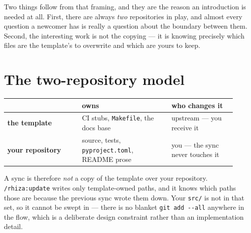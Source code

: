 \documentclass[11pt,a4paper]{article}
\newcommand{\cmd}[1]{\texttt{/rhiza:#1}}
\newcommand{\file}[1]{\texttt{#1}}
\begin{document}
Two things follow from that framing, and they are the reason an introduction is needed
at all. First, there are always \emph{two} repositories in play, and almost every
question a newcomer has is really a question about the boundary between them. Second,
the interesting work is not the copying --- it is knowing precisely which files are the
template's to overwrite and which are yours to keep.

\section{The two-repository model}

\begin{center}
\begin{tabular}{@{}p{0.30\linewidth}p{0.36\linewidth}p{0.26\linewidth}@{}}
\toprule
& \textbf{owns} & \textbf{who changes it} \\
\midrule
\textbf{the template} &
CI stubs, \file{Makefile}, the docs base &
upstream --- you receive it \\[0.4em]
\textbf{your repository} &
source, tests, \file{pyproject.toml}, README prose &
you --- the sync never touches it \\
\bottomrule
\end{tabular}
\end{center}

\noindent
A sync is therefore \emph{not} a copy of the template over your repository. \cmd{update}
writes only template-owned paths, and it knows which paths those are because the
previous sync wrote them down. Your \file{src/} is not in that set, so it cannot be
swept in --- there is no blanket \texttt{git add -{}-all} anywhere in the flow, which is a
deliberate design constraint rather than an implementation detail.

\begin{center}
\end{center}
\end{document}
